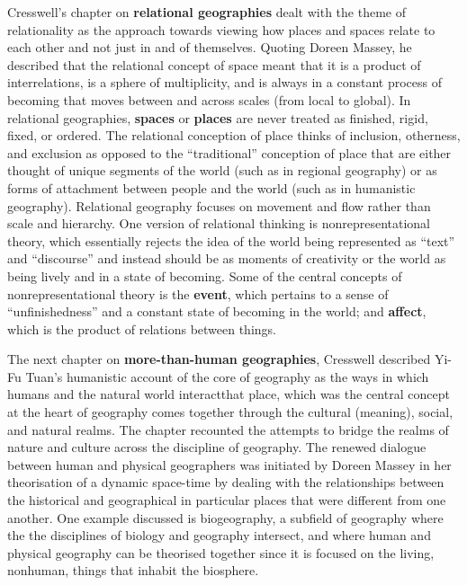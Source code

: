 \documentclass[a4paper, 10.5pt]{article} %
\begin{document}
Cresswell's chapter on \textbf{relational geographies} dealt with the theme of relationality as the approach towards viewing how places and spaces relate to each other and not just in and of themselves. Quoting Doreen Massey, he described that the relational concept of space meant that it is a product of interrelations, is a sphere of multiplicity, and is always in a constant process of becoming that moves between and across scales (from local to global). In relational geographies, \textbf{spaces} or \textbf{places} are never treated as finished, rigid, fixed, or ordered. The relational conception of place thinks of inclusion, otherness, and exclusion as opposed to the \enquote{traditional} conception of place that are either thought of unique segments of the world (such as in regional geography) or as forms of attachment between people and the world (such as in humanistic geography). Relational geography focuses on movement and flow rather than scale and hierarchy. One version of relational thinking is nonrepresentational theory, which essentially rejects the idea of the world being represented as \enquote{text} and \enquote{discourse} and instead should be as moments of creativity or the world as being lively and in a state of becoming. Some of the central concepts of nonrepresentational theory is the \textbf{event}, which pertains to a sense of \enquote{unfinishedness} and a constant state of becoming in the world; and \textbf{affect}, which is the product of relations between things.

The next chapter on \textbf{more-than-human geographies}, Cresswell described Yi-Fu Tuan's humanistic account of the core of geography as the ways in which humans and the natural world interact\textemdash{}that place, which was the central concept at the heart of geography comes together through the cultural (meaning), social, and natural realms. The chapter recounted the attempts to bridge the realms of nature and culture across the discipline of geography. The renewed dialogue between human and physical geographers was initiated by Doreen Massey in her theorisation of a dynamic space-time by dealing with the relationships between the historical and geographical in particular places that were different from one another. One example discussed is biogeography, a subfield of geography where the the disciplines of biology and geography intersect, and where human and physical geography can be theorised together since it is focused on the living, nonhuman, things that inhabit the biosphere.






\end{document}
